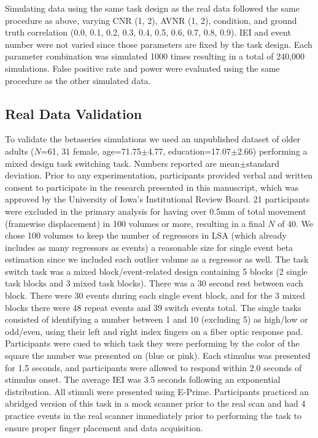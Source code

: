 \documentclass[10pt,letterpaper]{article}
\begin{document}
Simulating data using the same task design as the real data followed the same
procedure as above, varying CNR (1, 2), AVNR (1, 2), condition,
and ground truth correlation (0.0, 0.1, 0.2, 0.3, 0.4, 0.5, 0.6, 0.7, 0.8, 0.9).
IEI and event number were not varied since those parameters are fixed by the
task design.
Each parameter combination was simulated 1000 times resulting in a total of 240,000 simulations.
False positive rate and power were evaluated using the same procedure as the other simulated data.

\subsection*{Real Data Validation}
\label{methods:task-switch}

To validate the betaseries simulations we used an unpublished dataset
of older adults ($N$=61, 31 female, age=71.75$\pm$4.77, education=17.07$\pm$2.66)
performing a mixed design task switching task.
Numbers reported are mean$\pm$standard deviation.
Prior to any experimentation, participants provided verbal and written consent
to participate in the research presented in this manuscript, which was approved
by the University of Iowa's Institutional Review Board.
21 participants were excluded in the primary analysis for having over
0.5mm of total movement (framewise displacement) in 100 volumes or more,
resulting in a final $N$ of 40.
We chose 100 volumes to keep the number of regressors in LSA
(which already includes as many regressors as events) a reasonable size
for single event beta estimation since we included each outlier volume
as a regressor as well.
The task switch task was a mixed block/event-related design containing
5 blocks (2 single task blocks and 3 mixed task blocks).
There was a 30 second rest between each block.
There were 30 events during each single event block,
and for the 3 mixed blocks there were 48 repeat events and 39 switch events total.
The single tasks consisted of identifying a number between
1 and 10 (excluding 5) as high/low or odd/even, using their left and right index fingers
on a fiber optic response pad.
Participants were cued to which task they were performing by the color of the square
the number was presented on (blue or pink).
Each stimulus was presented for 1.5 seconds, and participants were allowed
to respond within 2.0 seconds of stimulus onset.
The average IEI was 3.5 seconds following an exponential distribution.
All stimuli were presented using E-Prime.
Participants practiced an abridged version of this task in a mock scanner
prior to the real scan and had 4 practice events in the real scanner immediately
prior to performing the task to ensure proper finger placement and data acquisition.
\end{document}
